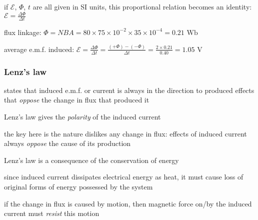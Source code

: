 \cmt if $\mathcal{E}$, $\Phi$, $t$ are all given in SI units, this proportional relation becomes an identity: $\boxed{\mathcal{E} = \frac{\Delta \Phi}{\Delta t}}$


\sol flux linkage: $\Phi = NBA = 80 \times 75\times10^{-2} \times 35 \times 10^{-4} = 0.21 \text{ Wb}$

average e.m.f. induced: $\mathcal{E} = \frac{\Delta \Phi}{\Delta t} = \frac{(+\Phi)-(-\Phi)}{\Delta t} = \frac{2\times 0.21}{0.40} = 1.05 \text{ V}$ \eoe

\subsubsection{Lenz's law}

\rcyskip

\begin{ilight}
	 states that induced e.m.f. or current is always in the direction to produced effects that \emph{oppose} the change in flux that produced it 
\end{ilight}

\cmt Lenz's law gives the \emph{polarity} of the induced current

the key here is the nature dislikes any change in flux: effects of induced current always \emph{oppose} the cause of its production

\cmt Lenz's law is a consequence of the conservation of energy

since induced current dissipates electrical energy as heat, it must cause loss of original forms of energy possessed by the system

if the change in flux is caused by motion, then magnetic force on/by the induced current must \emph{resist} this motion



